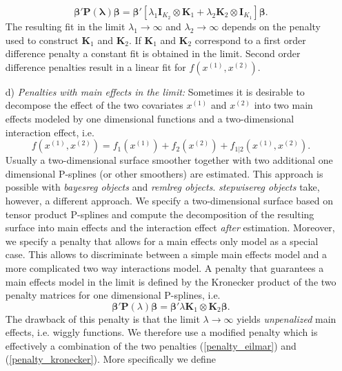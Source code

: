 \documentclass[11pt,a4paper,twoside]{bayesxarticle}
\def \Kvec {\vec{K}}
\def \Pvec {\vec{P}}
\def \lambdavec {\boldsymbol{\lambda}}
\def \betavec {\boldsymbol{\beta}}
\def \Kvec {\mathbf{K}}
\def \Ivec {\mathbf{I}}
\def \Pvec {\mathbf{P}}
\begin{document}
\begin{enumerate}
\begin{equation}
\label{penalty_eilmar}
 \betavec'\Pvec(\lambdavec) \betavec = \betavec'\left[\lambda_1 \Ivec_{K_2}\otimes\Kvec_1 + \lambda_2 \Kvec_2\otimes \Ivec_{K_1}\right]\betavec.
\end{equation}
The resulting fit in the limit $\lambda_1 \rightarrow \infty$ and
$\lambda_2 \rightarrow \infty$ depends on the penalty used to
construct $\Kvec_1$ and $\Kvec_2$. If $\Kvec_1$ and $\Kvec_2$
correspond to a first order difference penalty a constant fit is
obtained in the limit. Second order difference penalties result in a
linear fit for $f\left(x^{(1)},x^{(2)}\right)$.
\item[d)] {\em Penalties with main effects in the limit:} Sometimes it is desirable to decompose the effect of the two covariates
$x^{(1)}$ and $x^{(2)}$ into two main effects modeled by one
dimensional functions and a two-dimensional interaction effect, i.e.
\begin{equation}
\label{pspline_2dimtermmain} f \left(x^{(1)},x^{(2)}\right) =
f_1\left(x^{(1)} \right) + f_2 \left(x^{(2)}\right) + f_{1|2}\left(
x^{(1)},x^{(2)} \right).
\end{equation}
Usually a two-dimensional surface smoother  together with two
additional  one dimensional P-splines (or other smoothers) are
estimated. This approach is possible with {\em bayesreg objects} and
{\em remlreg objects}. {\em stepwisereg objects} take, however, a
different approach. We specify a two-dimensional surface based on
tensor product P-splines and compute the decomposition of the
resulting surface into main effects and the interaction effect {\em
after} estimation. Moreover, we specify a penalty that allows for a
main effects only model as a special case. This allows to
discriminate between a simple  main effects model and a more
complicated two way interactions model. A penalty that guarantees  a
main effects model in the limit is defined by the Kronecker product
of the two penalty matrices for one dimensional P-splines, i.e.
\begin{equation}
\label{penalty_kronecker}
\betavec'\Pvec(\lambda)\betavec = \betavec' \lambda \Kvec_1 \otimes \Kvec_2 \betavec.
\end{equation}
The drawback of this penalty is that the limit $\lambda \rightarrow \infty $ yields {\em unpenalized} main effects, i.e. wiggly functions.
We therefore use a modified penalty which is effectively a combination of the two  penalties  (\ref{penalty_eilmar}) and
(\ref{penalty_kronecker}). More specifically
we define
\begin{equation}

\end{equation}
\end{enumerate}
\end{document}
